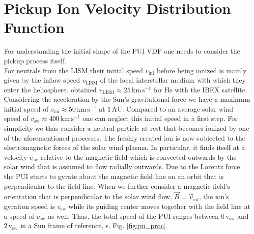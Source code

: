 \section{Pickup Ion Velocity Distribution Function}
\label{sec:theo_vdf}
For understanding the initial shape of the PUI VDF one needs to consider the pickup process itself. \\
For neutrals from the LISM their initial speed $v_{\mathrm{ini}}$ before being ionized is mainly given by the inflow speed $v_{\mathrm{LISM}}$ of the local interstellar medium with which they enter the heliosphere. \citet{schwadron_2015_ibex} obtained $v_{\mathrm{LISM}} \approx 25 \,\mathrm{km\,s^{-1}}$ for $\mathrm{He}$ with the IBEX satellite. Considering the acceleration by the Sun's gravitational force we have a maximum initial speed of $v_{\mathrm{ini}} \approx 50 \,\mathrm{km\,s^{-1}}$ at $1\,\mathrm{AU}$. Compared to an average solar wind speed of $v_{\mathrm{sw}} \approx 400\,\mathrm{km\,s^{-1}}$ one can neglect this initial speed in a first step. For simplicity we thus consider a neutral particle at rest that becomes ionized by one of the aforementioned processes. The freshly created ion is now subjected to the electromagnetic forces of the solar wind plasma. In particular, it finds itself at a velocity $v_{\mathrm{sw}}$ relative to the magnetic field which is convected outwards by the solar wind that is assumed to flow radially outwards. Due to the Lorentz force the PUI starts to gyrate about the magnetic field line on an orbit that is perpendicular to the field line.
When we further consider a magnetic field's orientation that is perpendicular to the solar wind flow, $\vec{B} \perp \vec{v}_{\mathrm{sw}}$, the ion's gyration speed is $v_{\mathrm{sw}}$ while its guiding center moves together with the field line at a speed of $v_{\mathrm{sw}}$ as well.
Thus, the total speed of the PUI ranges between $0\, \mathrm{v_{\mathrm{sw}}} $ and $2 \, \mathrm{v_{\mathrm{sw}}}$ in a Sun frame of reference, s. Fig. \ref{fig:pu_proc}.
